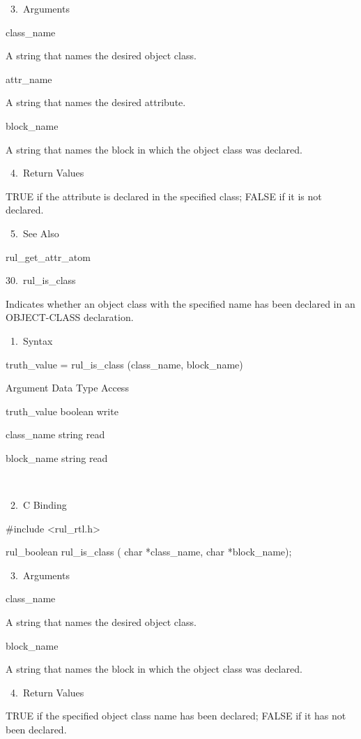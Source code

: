 {       3. Arguments

          class_name

          A string that names the desired
          object class.

          attr_name

          A string that names the desired
          attribute.

          block_name

          A string that names the block in
          which the object class was declared.

       4. Return Values

          TRUE if the attribute is declared in
          the specified class; FALSE if it is
          not declared.

       5. See Also

    rul_get_attr_atom

30. rul_is_class

    Indicates whether an object class with the
    specified name has been declared in an
    OBJECT-CLASS declaration.

       1. Syntax

          truth_value = rul_is_class
          (class_name, block_name)

          Argument  Data Type    Access

          truth_value  boolean    write

          class_name  string    read

          block_name  string    read

           

       2. C Binding

          #include <rul_rtl.h>

          rul_boolean rul_is_class (
          char *class_name,
          char *block_name);

       3. Arguments

          class_name

          A string that names the desired
          object class.

          block_name

          A string that names the block in
          which the object class was declared.

       4. Return Values

          TRUE if the specified object class
          name has been declared; FALSE if it
          has not been declared.

}
